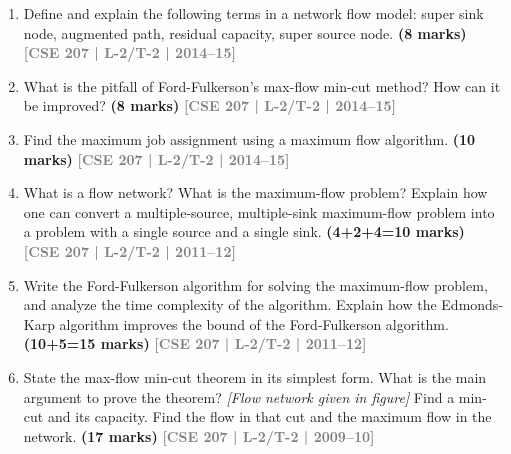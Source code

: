 \documentclass[12pt,a3paper]{article}
\newcommand{\yr}[1]{\hfill\textcolor{gray}{\small\textbf{[#1]}}}
\newcommand{\mk}[1]{\textcolor{orange!70!black}{\small\textbf{(#1 marks)}}}
\begin{document}
\begin{enumerate}
\begin{center}
\begin{tikzpicture}[
    every node/.style={circle, draw, minimum size=0.9cm, font=\bfseries},
    edge label/.style={rectangle, draw=none, font=\normalfont\small},
    every path/.style={->, line width=0.8pt},
  ]
  \end{tikzpicture}

\end{center}

\item Define and explain the following terms in a network flow model: super sink node, augmented path, residual capacity, super source node. \mk{8}
\yr{CSE 207 | L-2/T-2 | 2014--15}

\item What is the pitfall of Ford-Fulkerson's max-flow min-cut method? How can it be improved? \mk{8}
\yr{CSE 207 | L-2/T-2 | 2014--15}

\item Find the maximum job assignment using a maximum flow algorithm. \mk{10}
\yr{CSE 207 | L-2/T-2 | 2014--15}

\begin{center}
\end{center}

\item What is a flow network? What is the maximum-flow problem? Explain how one can convert a multiple-source, multiple-sink maximum-flow problem into a problem with a single source and a single sink. \mk{4+2+4=10}
\yr{CSE 207 | L-2/T-2 | 2011--12}

\item Write the Ford-Fulkerson algorithm for solving the maximum-flow problem, and analyze the time complexity of the algorithm. Explain how the Edmonds-Karp algorithm improves the bound of the Ford-Fulkerson algorithm. \mk{10+5=15}
\yr{CSE 207 | L-2/T-2 | 2011--12}

\item State the max-flow min-cut theorem in its simplest form. What is the main argument to prove the theorem? \textit{[Flow network given in figure]} Find a min-cut and its capacity. Find the flow in that cut and the maximum flow in the network. \mk{17}
\yr{CSE 207 | L-2/T-2 | 2009--10}



\end{enumerate}
\end{document}

